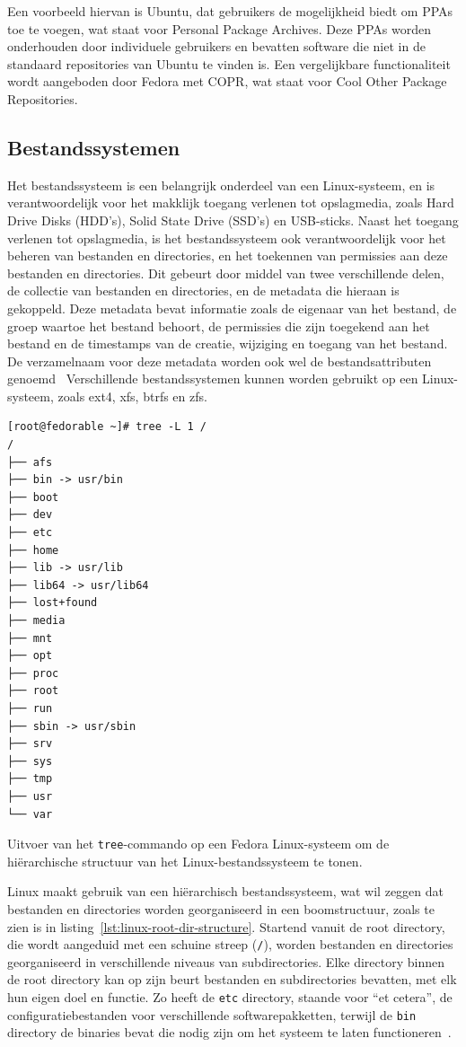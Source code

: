 Een voorbeeld hiervan is Ubuntu, dat gebruikers de mogelijkheid biedt om PPAs toe te voegen, wat staat voor Personal Package Archives.
Deze PPAs worden onderhouden door individuele gebruikers en bevatten software die niet in de standaard repositories van Ubuntu te vinden is.
Een vergelijkbare functionaliteit wordt aangeboden door Fedora met COPR, wat staat voor Cool Other Package Repositories.

\subsection{Bestandssystemen}
\label{linux_bestandssystemen}

Het bestandssysteem is een belangrijk onderdeel van een Linux-systeem, en is verantwoordelijk voor het makklijk toegang verlenen tot opslagmedia, zoals Hard Drive Disks (HDD's), Solid State Drive (SSD's) en USB-sticks.
Naast het toegang verlenen tot opslagmedia, is het bestandssysteem ook verantwoordelijk voor het beheren van bestanden en directories, en het toekennen van permissies aan deze bestanden en directories.
Dit gebeurt door middel van twee verschillende delen, de collectie van bestanden en directories, en de metadata die hieraan is gekoppeld.
Deze metadata bevat informatie zoals de eigenaar van het bestand, de groep waartoe het bestand behoort, de permissies die zijn toegekend aan het bestand en de timestamps van de creatie, wijziging en toegang van het bestand.
De verzamelnaam voor deze metadata worden ook wel de bestandsattributen genoemd~\autocite{silberschatz2013os}
Verschillende bestandssystemen kunnen worden gebruikt op een Linux-systeem, zoals ext4, xfs, btrfs en zfs.

\begin{listing}
  \begin{verbatim}
[root@fedorable ~]# tree -L 1 /
/
├── afs
├── bin -> usr/bin
├── boot
├── dev
├── etc
├── home
├── lib -> usr/lib
├── lib64 -> usr/lib64
├── lost+found
├── media
├── mnt
├── opt
├── proc
├── root
├── run
├── sbin -> usr/sbin
├── srv
├── sys
├── tmp
├── usr
└── var
  \end{verbatim}
  \caption{Uitvoer van het \texttt{tree}-commando op een Fedora Linux-systeem om de hi\"erarchische structuur van het Linux-bestandssysteem te tonen.}
  \label{lst:linux-root-dir-structure}
\end{listing}

Linux maakt gebruik van een hi\"erarchisch bestandssysteem, wat wil zeggen dat bestanden en directories worden georganiseerd in een boomstructuur, zoals te zien is in listing~\ref{lst:linux-root-dir-structure}.
Startend vanuit de root directory, die wordt aangeduid met een schuine streep (\texttt{/}), worden bestanden en directories georganiseerd in verschillende niveaus van subdirectories.
Elke directory binnen de root directory kan op zijn beurt bestanden en subdirectories bevatten, met elk hun eigen doel en functie.
Zo heeft de \texttt{etc} directory, staande voor ``et cetera'', de configuratiebestanden voor verschillende softwarepakketten, terwijl de \texttt{bin} directory de binaries bevat die nodig zijn om het systeem te laten functioneren~\autocite{linuxfoundation-filesystem}.

